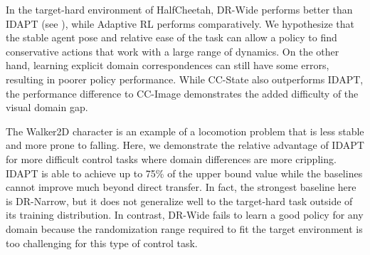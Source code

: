 In the target-hard environment of HalfCheetah, DR-Wide performs better than IDAPT (see ), while Adaptive RL performs comparatively.  We hypothesize that the stable agent pose and relative ease of the task can allow a policy to find conservative actions that work with a large range of dynamics. On the other hand, learning explicit domain correspondences can still have some errors, resulting in poorer policy performance.  While CC-State also outperforms IDAPT, the performance difference to CC-Image demonstrates the added difficulty of the visual domain gap.

The Walker2D character is an example of a locomotion problem that is less stable and more prone to falling.  Here, we demonstrate the relative advantage of IDAPT for more difficult control tasks where domain differences are more crippling.  IDAPT is able to achieve up to 75\% of the upper bound value  while the baselines cannot improve much beyond direct transfer.  In fact, the strongest baseline here is DR-Narrow, but it does not generalize well to the target-hard task outside of its training distribution.  In contrast, DR-Wide fails to learn a good policy for any domain because the randomization range required to fit the target environment is too challenging for this type of control task.


